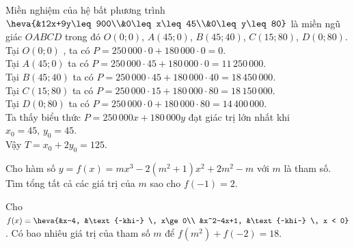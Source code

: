 \begin{bt}
{\begin{center}
		\end{center}
		Miền nghiệm của hệ bất phương trình $\heva{&12x+9y\leq 900\\&0\leq x\leq 45\\&0\leq y\leq 80}$ là miền ngũ giác  $OABCD$ trong đó $O\left(0;0\right)$, $A\left(45;0\right)$, $B\left(45;40\right)$, $C\left(15;80\right)$, $D\left(0;80\right)$. \\
		Tại $O\left(0;0\right)$  , ta có $P=250\,000\cdot0+180\,000\cdot0=0$.\\
		Tại $A\left(45;0\right)$ ta  có $P=250\,000\cdot45+180\,000\cdot0=11\,250\,000$.\\
		Tại $B\left(45;40\right)$ ta  có $P=250\,000\cdot45+180\,000\cdot40=18\,450\,000$. \\
		Tại $C\left(15;80\right)$ ta có  $P=250\,000\cdot15+180\,000\cdot80=18\,150\,000$. \\
		Tại $D\left(0;80\right)$ ta có $P=250\,000\cdot0+180\,000\cdot80=14\,400\,000$.\\ 
		 Ta thấy biểu thức $P=250\,000x+180\,000y$ đạt giác trị lớn nhất khi $x_0=45, \, y_0=45$.\\
		Vậy  $T=x_0+2y_0=125$.
	 }
\end{bt}

\begin{bt}%
	Cho hàm số $y=f(x)=m{x^3}-2(m^2+1){x^2}+2m^2-m$ với $m$ là tham số. Tìm tổng tất cả các giá trị của $m$ sao cho  $f(-1)=2$.
\end{bt}

\begin{bt}%
	Cho $f(x)=\heva{&x-4, &\text{~khi~}  \, x\ge 0\\ &x^2-4x+1, &\text{~khi~} \, x < 0}$. Có bao nhiêu giá trị của tham số $m$ để $f(m^2)+f(-2)=18$.
\end{bt}

